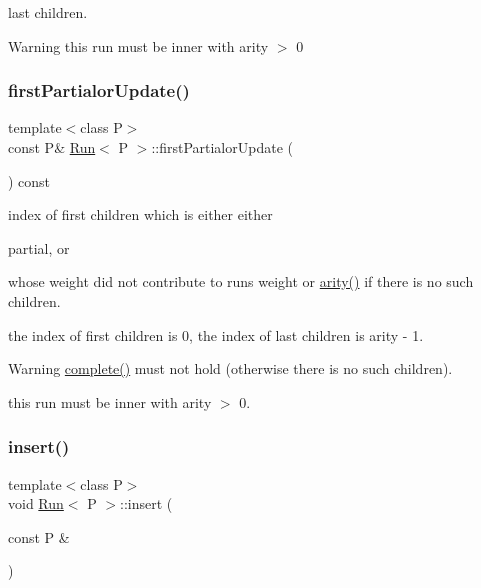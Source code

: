 last children. 

\begin{DoxyWarning}{Warning}
this run must be inner with arity $>$ 0 
\end{DoxyWarning}
\mbox{\label{classRun_a94a0bfa98d5891b750ba88e5f31441ad}} 
\subsubsection{\texorpdfstring{firstPartialorUpdate()}{firstPartialorUpdate()}}
{\footnotesize\ttfamily template$<$class P$>$ \\
const P\& \mbox{\hyperlink{classRun}{Run}}$<$ P $>$\+::first\+Partialor\+Update (\begin{DoxyParamCaption}{ }\end{DoxyParamCaption}) const}



index of first children which is either either 


\begin{DoxyItemize}
\item partial, or
\item whose weight did not contribute to run\textquotesingle{}s weight or \mbox{\hyperlink{classRun_ab9eeb2e8033cf68b80099e56ddca8ff1}{arity()}} if there is no such children.
\end{DoxyItemize}

the index of first children is 0, the index of last children is arity -\/ 1. \begin{DoxyWarning}{Warning}
\mbox{\hyperlink{classRun_a8b93caf0971738f454db7815db41501e}{complete()}} must not hold (otherwise there is no such children). 

this run must be inner with arity $>$ 0. 
\end{DoxyWarning}
\mbox{\label{classRun_ab41a4b6f0347b7b412637d505614b98f}} 
\subsubsection{\texorpdfstring{insert()}{insert()}}
{\footnotesize\ttfamily template$<$class P$>$ \\
void \mbox{\hyperlink{classRun}{Run}}$<$ P $>$\+::insert (\begin{DoxyParamCaption}\item[{const P \&}]{ }\end{DoxyParamCaption})}



